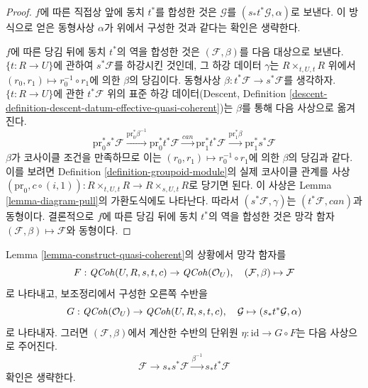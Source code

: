 \begin{proof}
\medskip\noindent
$f$에 따른 직접상 앞에 동치 $t^*$를 합성한 것은 $\mathcal{G}$를 $(s_*t^*\mathcal{G}, \alpha)$로 보낸다.
이 방식으로 얻은 동형사상 $\alpha$가 위에서 구성한 것과 같다는 확인은 생략한다.

\medskip\noindent
$f$에 따른 당김 뒤에 동치 $t^*$의 역을 합성한 것은 $(\mathcal{F}, \beta)$를 다음 대상으로 보낸다.
$\{t : R \to U\}$에 관하여 $s^*\mathcal{F}$를 하강시킨 것인데, 그 하강 데이터 $\gamma$는
$R \times_{t, U, t} R$ 위에서 $(r_0, r_1) \mapsto r_0^{-1} \circ r_1$에 의한 $\beta$의 당김이다.
동형사상 $\beta : t^*\mathcal{F} \to s^*\mathcal{F}$를 생각하자. $\{t : R \to U\}$에 관한
$t^*\mathcal{F}$ 위의 표준 하강 데이터(Descent, Definition
\ref{descent-definition-descent-datum-effective-quasi-coherent})는 $\beta$를 통해 다음 사상으로 옮겨진다.
$$
\text{pr}_0^*s^*\mathcal{F}
\xrightarrow{\text{pr}_0^*\beta^{-1}}
\text{pr}_0^*t^*\mathcal{F}
\xrightarrow{can}
\text{pr}_1^*t^*\mathcal{F}
\xrightarrow{\text{pr}_1^*\beta}
\text{pr}_1^*s^*\mathcal{F}
$$
$\beta$가 코사이클 조건을 만족하므로 이는 $(r_0, r_1) \mapsto r_0^{-1} \circ r_1$에 의한 $\beta$의 당김과 같다.
이를 보려면 Definition \ref{definition-groupoid-module}의 실제 코사이클 관계를 사상
$(\text{pr}_0, c \circ (i, 1)) : R \times_{t, U, t} R \to R \times_{s, U, t} R$로 당기면 된다.
이 사상은 Lemma \ref{lemma-diagram-pull}의 가환도식에도 나타난다. 따라서
$(s^*\mathcal{F}, \gamma)$는 $(t^*\mathcal{F}, can)$과 동형이다. 결론적으로 $f$에 따른 당김 뒤에 동치 $t^*$의 역을
합성한 것은 망각 함자 $(\mathcal{F}, \beta) \mapsto \mathcal{F}$와 동형이다.
\end{proof}

\begin{remark}
\label{remark-adjunction-map}
Lemma \ref{lemma-construct-quasi-coherent}의 상황에서 망각 함자를
$$
F : \mathit{QCoh}(U, R, s, t, c) \to \mathit{QCoh}(\mathcal{O}_U),\quad
(\mathcal{F}, \beta) \mapsto \mathcal{F}
$$
로 나타내고, 보조정리에서 구성한 오른쪽 수반을
$$
G : \mathit{QCoh}(\mathcal{O}_U) \to \mathit{QCoh}(U, R, s, t, c),\quad
\mathcal{G} \mapsto (s_*t^*\mathcal{G}, \alpha)
$$
로 나타내자. 그러면 $(\mathcal{F}, \beta)$에서 계산한 수반의 단위원
$\eta : \text{id} \to G \circ F$는 다음 사상으로 주어진다.
$$
\mathcal{F} \to s_*s^*\mathcal{F} \xrightarrow{\beta^{-1}} s_*t^*\mathcal{F}
$$
확인은 생략한다.
\end{remark}


